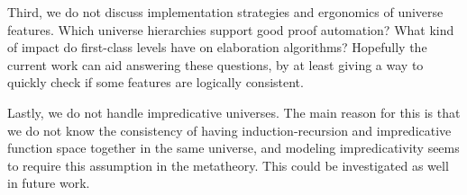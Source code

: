 \documentclass[a4paper,UKenglish,cleveref, autoref, thm-restate]{lipics-v2021}
\theoremstyle{remark}
\theoremstyle{definition}
\begin{document}
Third, we do not discuss implementation strategies and ergonomics of universe
features. Which universe hierarchies support good proof automation? What kind of
impact do first-class levels have on elaboration algorithms? Hopefully the
current work can aid answering these questions, by at least giving a way to quickly
check if some features are logically consistent.

Lastly, we do not handle impredicative universes. The main reason for this is
that we do not know the consistency of having induction-recursion and
impredicative function space together in the same universe, and modeling
impredicativity seems to require this assumption in the metatheory. This could
be investigated as well in future work.



\end{document}
